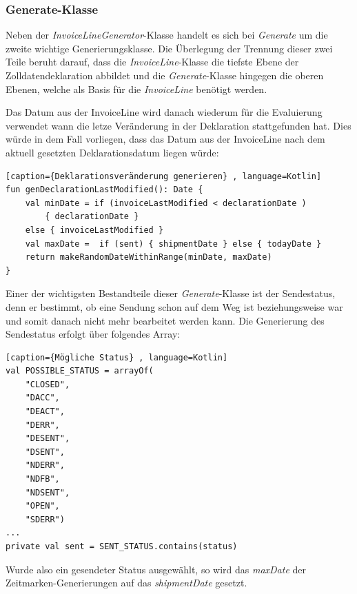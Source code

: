 \subsubsection{Generate-Klasse}
Neben der \textit{InvoiceLineGenerator}-Klasse handelt es sich bei \textit{Generate} um die zweite wichtige Generierungsklasse. Die Überlegung der Trennung dieser zwei Teile beruht darauf, dass die \textit{InvoiceLine}-Klasse die tiefste Ebene der Zolldatendeklaration abbildet und die \textit{Generate}-Klasse hingegen die oberen Ebenen, welche als Basis für die \textit{InvoiceLine} benötigt werden. 
\vspace{4mm}\par
Das Datum aus der InvoiceLine wird danach wiederum für die Evaluierung verwendet  wann die letze Veränderung in der Deklaration stattgefunden hat. Dies würde in dem Fall vorliegen, dass das Datum aus der InvoiceLine nach dem aktuell gesetzten Deklarationsdatum liegen würde:
\begin{lstlisting}[caption={Deklarationsveränderung generieren} , language=Kotlin]
fun genDeclarationLastModified(): Date {
    val minDate = if (invoiceLastModified < declarationDate ) 
        { declarationDate } 
    else { invoiceLastModified }
    val maxDate =  if (sent) { shipmentDate } else { todayDate }
    return makeRandomDateWithinRange(minDate, maxDate)
}
\end{lstlisting}
\vspace{4mm}\par
\newpage
Einer der wichtigsten Bestandteile dieser \textit{Generate}-Klasse ist der Sendestatus, denn er bestimmt, ob eine Sendung schon auf dem Weg ist beziehungsweise war und somit danach nicht mehr bearbeitet werden kann. Die Generierung des Sendestatus erfolgt über folgendes Array:
\begin{lstlisting}[caption={Mögliche Status} , language=Kotlin]
val POSSIBLE_STATUS = arrayOf(
    "CLOSED",
    "DACC",
    "DEACT",
    "DERR",
    "DESENT",
    "DSENT",
    "NDERR",
    "NDFB",
    "NDSENT",
    "OPEN",
    "SDERR")
...
private val sent = SENT_STATUS.contains(status)
\end{lstlisting}
\vspace{4mm}\par
Wurde also ein gesendeter Status ausgewählt, so wird das \textit{maxDate} der Zeitmarken-Generierungen auf das \textit{shipmentDate} gesetzt.

